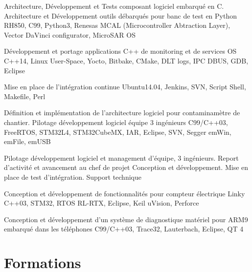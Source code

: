 \documentclass[11pt, a4paper, sans]{moderncv}
\begin{document}
	{Architecture, Développement et Tests composant logiciel embarqué en C. Architecture et Développement outils débarqués pour banc de test en Python}
	{RH850, C99, Python3, Renesas MCAL (Microcontroller Abtraction Layer), Vector DaVinci configurator, MicroSAR OS}

	{Développement et portage applications C++ de monitoring et de services OS}
	{C++14, Linux User-Space, Yocto, Bitbake, CMake, DLT logs, IPC DBUS, GDB, Eclipse}

	{Mise en place de l’intégration continue}
	{Ubuntu14.04, Jenkins, SVN, Script Shell, Makefile, Perl}

	{Définition et implémentation de l’architecture logiciel pour contaminamètre de chantier. Pilotage développement logiciel équipe 3 ingénieurs}
	{C99/C++03, FreeRTOS, STM32L4, STM32CubeMX, IAR, Eclipse, SVN, Segger emWin, emFile, emUSB}

	{Pilotage développement logiciel et management d’équipe, 3 ingénieurs. Report d’activité et avancement au chef de projet}
	{Conception et développement. Mise en place de test d’intégration. Support technique}

	{Conception et développement de fonctionnalités pour compteur électrique Linky}
	{C++03, STM32, RTOS RL-RTX, Eclipse, Keil uVision, Perforce}

	{Conception et développement d’un système de diagnostique matériel pour ARM9 embarqué dans les téléphones}
	{C99/C++03, Trace32, Lauterbach, Eclipse, QT 4}

\section{Formations}
\end{document}
